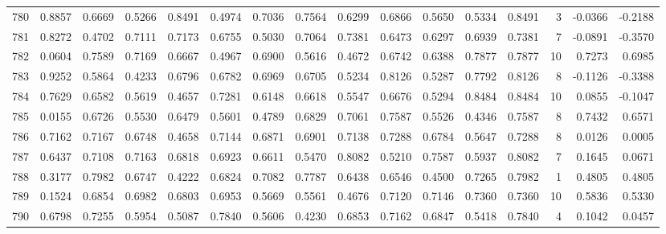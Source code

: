 \begin{tabular}{lrrrrrrrrrrrrrrr}
780 &      0.8857 &  0.6669 &  0.5266 &  0.8491 &  0.4974 &  0.7036 &  0.7564 &  0.6299 &  0.6866 &  0.5650 &   0.5334 &     0.8491 &      3 &                   -0.0366 &                    -0.2188 \\
781 &      0.8272 &  0.4702 &  0.7111 &  0.7173 &  0.6755 &  0.5030 &  0.7064 &  0.7381 &  0.6473 &  0.6297 &   0.6939 &     0.7381 &      7 &                   -0.0891 &                    -0.3570 \\
782 &      0.0604 &  0.7589 &  0.7169 &  0.6667 &  0.4967 &  0.6900 &  0.5616 &  0.4672 &  0.6742 &  0.6388 &   0.7877 &     0.7877 &     10 &                    0.7273 &                     0.6985 \\
783 &      0.9252 &  0.5864 &  0.4233 &  0.6796 &  0.6782 &  0.6969 &  0.6705 &  0.5234 &  0.8126 &  0.5287 &   0.7792 &     0.8126 &      8 &                   -0.1126 &                    -0.3388 \\
784 &      0.7629 &  0.6582 &  0.5619 &  0.4657 &  0.7281 &  0.6148 &  0.6618 &  0.5547 &  0.6676 &  0.5294 &   0.8484 &     0.8484 &     10 &                    0.0855 &                    -0.1047 \\
785 &      0.0155 &  0.6726 &  0.5530 &  0.6479 &  0.5601 &  0.4789 &  0.6829 &  0.7061 &  0.7587 &  0.5526 &   0.4346 &     0.7587 &      8 &                    0.7432 &                     0.6571 \\
786 &      0.7162 &  0.7167 &  0.6748 &  0.4658 &  0.7144 &  0.6871 &  0.6901 &  0.7138 &  0.7288 &  0.6784 &   0.5647 &     0.7288 &      8 &                    0.0126 &                     0.0005 \\
787 &      0.6437 &  0.7108 &  0.7163 &  0.6818 &  0.6923 &  0.6611 &  0.5470 &  0.8082 &  0.5210 &  0.7587 &   0.5937 &     0.8082 &      7 &                    0.1645 &                     0.0671 \\
788 &      0.3177 &  0.7982 &  0.6747 &  0.4222 &  0.6824 &  0.7082 &  0.7787 &  0.6438 &  0.6546 &  0.4500 &   0.7265 &     0.7982 &      1 &                    0.4805 &                     0.4805 \\
789 &      0.1524 &  0.6854 &  0.6982 &  0.6803 &  0.6953 &  0.5669 &  0.5561 &  0.4676 &  0.7120 &  0.7146 &   0.7360 &     0.7360 &     10 &                    0.5836 &                     0.5330 \\
790 &      0.6798 &  0.7255 &  0.5954 &  0.5087 &  0.7840 &  0.5606 &  0.4230 &  0.6853 &  0.7162 &  0.6847 &   0.5418 &     0.7840 &      4 &                    0.1042 &                     0.0457 \\

\end{tabular}
